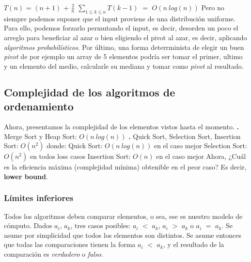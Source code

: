 \documentclass[10pt,a4paper]{article}
\begin{document}
\newline
\newline
$T(n)$ = $(n+1)$ + $\displaystyle \frac{2}{n}$ $\displaystyle \sum_{1 \leq k \leq n}^{} T(k-1)$ $=$ $O(n~log(n))$
\newline
\newline
\newline
Pero no siempre podemos suponer que el input proviene de una distribución uniforme. Para ello, podemos forzarlo permutando el input, es decir, desorden un poco el arreglo para beneficiar al azar o bien eligiendo el pivot al azar, es decir, aplicando \textit{algoritmos probabilísticos}. 
\newline
\newline
Por último, una forma deterrminista de elegir un buen \textit{pivot} de por ejemplo un array de 5 elementos podría ser tomar el primer, ultimo y un elemento del medio, calcularle su mediana y tomar como \textit{pivot} al resultado.

\subsection{Complejidad de los algoritmos de ordenamiento}

Ahora, presentamos la complejidad de los elementos vistos hasta el momento.
\newline
\newline
\textbf{.} Merge Sort y Heap Sort: $O(n~log(n))$
\newline
\newline
\textbf{.} Quick Sort, Selection Sort, Insertion Sort: $O(n^{2})$ donde:
\newline
\newline
Quick Sort: $O(n~log(n))$ en el caso mejor
\newline
\newline
Selection Sort: $O(n^{2})$ en todos loss casos
\newline
\newline
Insertion Sort: $O(n)$ en el caso mejor
\newline
\newline
Ahora, ¿Cuál es la eficiencia máxima (complejidad mínima) obtenible en el peor caso? Es decir, \textbf{lower bound}.

\subsubsection{Límites inferiores}

Todos los algoritmos deben comparar elementos, o sea, ese es nuestro modelo de cómputo.
\newline
\newline
Dados $a_{i}$, $a_{k}$, tres casos posibles: $a_{i}$ $<$ $a_{k}$, $a_{i}$ $>$ $a_{k}$ o $a_{i}$ $=$ $a_{k}$.
\newline
\newline
Se asume por simplicidad que todos los elementos son distintos.
\newline
\newline
Se asume entonces que todas las comparaciones tienen la forma $a_{i}$ $<$ $a_{k}$, y el resultado de la comparación es \textit{verdadero} o \textit{falso}. 
\newpage
\end{document}
